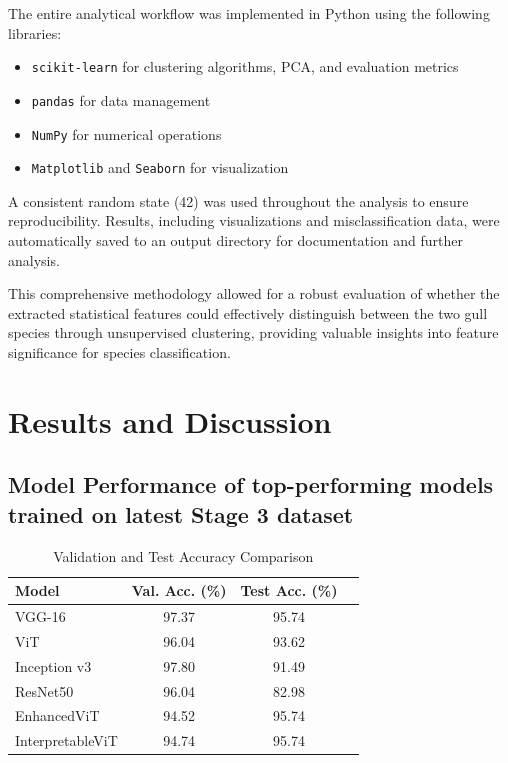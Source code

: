 \documentclass[a4paper,12pt]{report}
\begin{document}
The entire analytical workflow was implemented in Python using the following libraries:

\begin{itemize}
    \item \texttt{scikit-learn} for clustering algorithms, PCA, and evaluation metrics
    \item \texttt{pandas} for data management
    \item \texttt{NumPy} for numerical operations
    \item \texttt{Matplotlib} and \texttt{Seaborn} for visualization
\end{itemize}
A consistent random state (42) was used throughout the analysis to ensure reproducibility. Results, including visualizations and misclassification data, were automatically saved to an output directory for documentation and further analysis.

This comprehensive methodology allowed for a robust evaluation of whether the extracted statistical features could effectively distinguish between the two gull species through unsupervised clustering, providing valuable insights into feature significance for species classification.

\chapter{Results and Discussion}\label{res:resultsfull}

\section{Model Performance of top-performing models trained on latest Stage 3 dataset}

\begin{table}[H]
    \centering
    \caption{Validation and Test Accuracy Comparison}
    \label{tab:val_test_comparison}
    \begin{tabular}{lccc}
    \toprule
    \textbf{Model} & \textbf{Val. Acc. (\%)} & \textbf{Test Acc. (\%)} \\
    \midrule
    VGG-16  & 97.37 & 95.74 \\
    ViT & 96.04 & 93.62 \\
    Inception v3 & 97.80 & 91.49  \\
    ResNet50 & 96.04 & 82.98 \\
    EnhancedViT & 94.52 & 95.74  \\
    InterpretableViT & 94.74 & 95.74 \\
    \bottomrule
    \end{tabular}
\end{table}
\end{document}
